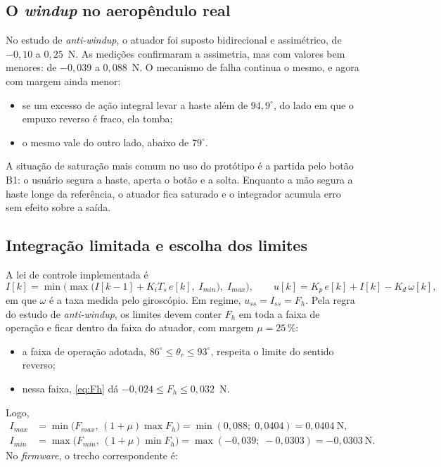 \documentclass[a4paper,11pt]{article}
\begin{document}
\subsection{O \textit{windup} no aeropêndulo real}

No estudo de \textit{anti-windup}, o atuador foi suposto bidirecional e assimétrico, de $-0{,}10$ a
$0{,}25$~N. As medições confirmaram a assimetria, mas com valores bem menores: de $-0{,}039$ a
$0{,}088$~N. O mecanismo de falha continua o mesmo, e agora com margem ainda menor:
\begin{itemize}
  \item se um excesso de ação integral levar a haste além de $94{,}9^\circ$, do lado em que o empuxo
    reverso é fraco, ela tomba;
  \item o mesmo vale do outro lado, abaixo de $79^\circ$.
\end{itemize}

A situação de saturação mais comum no uso do protótipo é a partida pelo botão B1: o usuário
segura a haste, aperta o botão e a solta. Enquanto a mão segura a haste longe da referência, o
atuador fica saturado e o integrador acumula erro sem efeito sobre a saída.

\subsection{Integração limitada e escolha dos limites}

A lei de controle implementada é
\begin{equation}
  I[k]=\min\!\Big(\max\big(I[k-1]+K_iT_s\,e[k],\;I_{min}\big),\;I_{max}\Big),\qquad
  u[k]=K_p\,e[k]+I[k]-K_d\,\omega[k],
  \label{eq:il}
\end{equation}
em que $\omega$ é a taxa medida pelo giroscópio. Em regime, $u_{ss}=I_{ss}=F_h$. Pela regra do estudo
de \textit{anti-windup}, os limites devem conter $F_h$ em toda a faixa de operação e ficar dentro da
faixa do atuador, com margem $\mu=25\,\%$:
\begin{itemize}
  \item a faixa de operação adotada, $86^\circ\le\theta_r\le 93^\circ$, respeita o limite do sentido
    reverso;
  \item nessa faixa, \eqref{eq:Fh} dá $-0{,}024\le F_h\le 0{,}032$~N.
\end{itemize}
Logo,
\begin{equation}
  \begin{aligned}
  I_{max}&=\min\big(F_{max},\,(1+\mu)\max F_h\big)=\min(0{,}088;\;0{,}0404)=0{,}0404~\mathrm{N},\\
  I_{min}&=\max\big(F_{min},\,(1+\mu)\min F_h\big)=\max(-0{,}039;\;-0{,}0303)=-0{,}0303~\mathrm{N}.
  \end{aligned}
\end{equation}
No \textit{firmware}, o trecho correspondente é:
\end{document}
